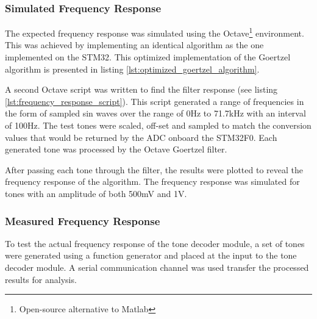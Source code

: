 \subsubsection{Simulated Frequency Response}
The expected frequency response was simulated using the Octave\footnote{Open-source alternative to Matlab} environment. This was achieved by implementing an identical algorithm as the one implemented on the STM32. This optimized implementation of the Goertzel algorithm is presented in listing \ref{lst:optimized_goertzel_algorithm}.

A second Octave script was written to find the filter response (see listing \ref{lst:frequency_response_script}). This script generated a range of frequencies in the form of sampled sin waves over the range of 0Hz to 71.7kHz with an interval of 100Hz. The test tones were scaled, off-set and sampled to match the conversion values that would be returned by the ADC onboard the STM32F0. Each generated tone was processed by the Octave Goertzel filter.

After passing each tone through the filter, the results were plotted to reveal the frequency response of the algorithm. The frequency response was simulated for tones with an amplitude of both 500mV and 1V.

\subsubsection{Measured Frequency Response}

To test the actual frequency response of the tone decoder module, a set of tones were generated using a function generator and placed at the input to the tone decoder module. A serial communication channel was used transfer the processed results for analysis.


